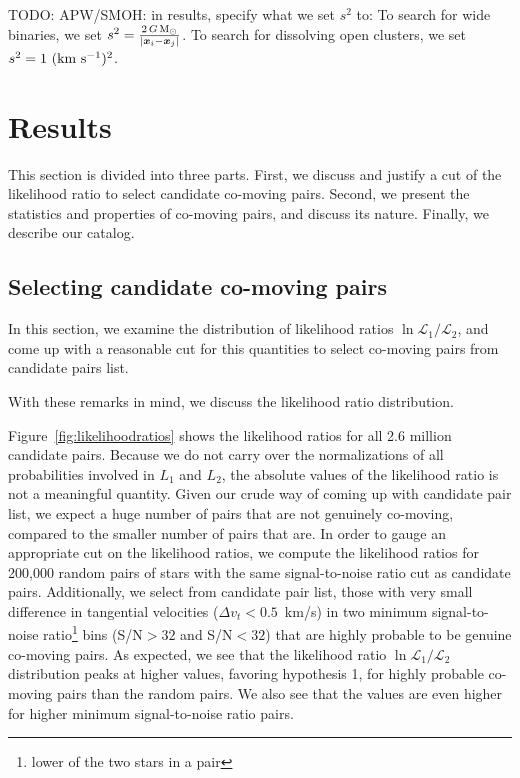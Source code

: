 \documentclass[manuscript, letterpaper]{aastex6}
\newcommand{\bs}[1]{\boldsymbol{#1}}
\renewcommand{\vec}[1]{\bs{#1}}
\newcommand{\kms}{\ensuremath{\rm km~s^{-1}}}
\newcommand{\msun}{{\rm M}_\odot}
\newcommand{\todo}[1]{{\color{red}TODO: #1}}
\begin{document}
\todo{APW/SMOH: in results, specify what we set $s^2$ to:}
To search for wide binaries, we set $s^2 = \frac{2 \, G \, \msun}{|\vec{x}_i-\vec{x}_j|}$.
To search for dissolving open clusters, we set $s^2 = 1~(\kms)^2$.


\section{Results}

This section is divided into three parts. First, we discuss and justify a cut of
the likelihood ratio to select candidate co-moving pairs.
Second, we present the statistics and properties of co-moving pairs, and discuss its nature.
Finally, we describe our catalog.

\subsection{Selecting candidate co-moving pairs}

In this section, we examine the distribution of likelihood ratios
$\ln \mathcal{L}_1 /\mathcal{L}_2$, and come up with a reasonable cut
for this quantities to select co-moving pairs from candidate pairs list.




With these remarks in mind, we discuss the likelihood ratio distribution.


Figure~\ref{fig:likelihoodratios} shows the likelihood ratios for all 2.6 million
candidate pairs.
Because we do not carry over the normalizations of all probabilities involved
in $L_1$ and $L_2$, the absolute values of the likelihood ratio is not
a meaningful quantity.
Given our crude way of coming up with candidate pair list, we expect
a huge number of pairs that are not genuinely co-moving, compared to
the smaller number of pairs that are.
In order to gauge an appropriate cut on the likelihood ratios,
we compute the likelihood ratios for 200,000 random pairs of stars with the same
signal-to-noise ratio cut as candidate pairs.
Additionally, we select from candidate pair list, those with very small
difference in tangential velocities ($\Delta v_t < 0.5$~km/s) in
two minimum signal-to-noise ratio\footnote{lower of the two stars in a pair}
bins (S/N$>32$ and S/N$<32$) that are highly probable
to be genuine co-moving pairs.
As expected, we see that the likelihood ratio $\ln \mathcal{L}_1 /\mathcal{L}_2$
distribution peaks at higher values, favoring hypothesis 1, for highly probable
co-moving pairs than the random pairs.
We also see that the values are even higher for higher minimum signal-to-noise ratio pairs.
\end{document}
